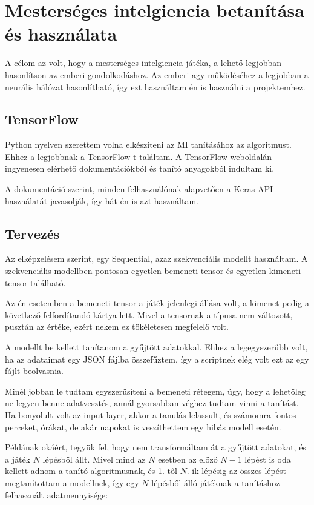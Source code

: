 \chapter{Mesterséges intelgiencia betanítása és használata}
\thispagestyle{fancy}
\pagestyle{fancy}


A célom az volt, hogy a mesterséges intelgiencia játéka, a lehető legjobban hasonlítson az emberi gondolkodáshoz. Az emberi agy működéséhez a legjobban 
a neurális hálózat hasonlítható, így ezt használtam én is használni a projektemhez. 



\section{TensorFlow}
Python nyelven szerettem volna elkészíteni az MI tanításához az algoritmust. Ehhez a legjobbnak a TensorFlow-t \cite{tensorflow2015-whitepaper} találtam. A TensorFlow weboldalán ingyenesen elérhető dokumentációkból és tanító anyagokból indultam ki. 

A dokumentáció szerint, minden felhasználónak alapvetően a Keras API \cite{chollet2015keras} használatát javasolják, így hát én is azt használtam. 

\section{Tervezés}
Az elképzelésem szerint, egy Sequential, azaz szekvenciális modellt használtam. A szekvenciális modellben pontosan egyetlen bemeneti tensor és egyetlen kimeneti tensor található.

Az én esetemben a bemeneti tensor a játék jelenlegi állása volt, a kimenet pedig a következő felfordítandó kártya lett. Mivel a tensornak a típusa nem változott, pusztán az értéke, ezért nekem ez tökéletesen megfelelő volt.

A modellt be kellett tanítanom a gyűjtött adatokkal. Ehhez a legegyszerűbb volt, ha az adataimat egy JSON fájlba összefűztem, így a scriptnek elég volt ezt az egy fájlt beolvasnia.

Minél jobban le tudtam egyszerűsíteni a bemeneti rétegem, úgy, hogy a lehetőleg ne legyen benne adatvesztés, annál gyorsabban véghez tudtam vinni a tanítást. 
Ha bonyolult volt az input layer, akkor a tanulás lelassult, és számomra fontos perceket, órákat, de akár napokat is veszíthettem egy hibás modell esetén.

Példának okáért, tegyük fel, hogy nem transformáltam át a gyűjtött adatokat, és a játék $N$ lépésből állt. 
Mivel mind az $N$ esetben az előző $N-1$ lépést is oda kellett adnom a tanító algoritmusnak, és 1.-től $N.$-ik lépésig az összes lépést megtanítottam a modellnek, 
így egy $N$ lépésből álló játéknak a tanításhoz felhasznált adatmennyisége:

